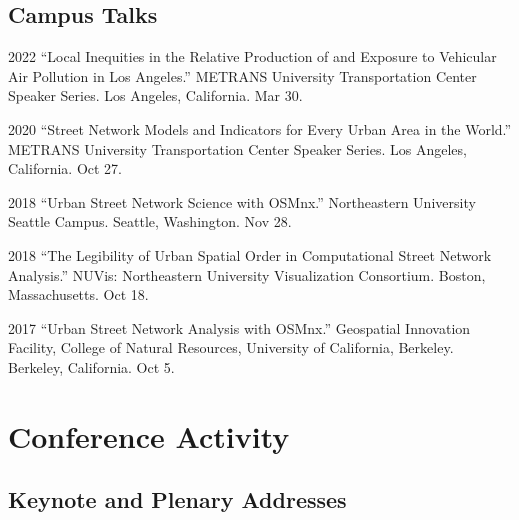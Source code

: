 \documentclass[11pt,letterpaper]{report}
\begin{document}
    \subsection*{Campus Talks}

    \begin{tablist}

        \item[2022] \tab{}\enquote{Local Inequities in the Relative Production of and Exposure to Vehicular Air Pollution in Los Angeles.} METRANS University Transportation Center Speaker Series. Los Angeles, California. Mar 30.

        \item[2020] \tab{}\enquote{Street Network Models and Indicators for Every Urban Area in the World.} METRANS University Transportation Center Speaker Series. Los Angeles, California. Oct 27.

        \item[2018] \tab{}\enquote{Urban Street Network Science with OSMnx.} Northeastern University Seattle Campus. Seattle, Washington. Nov 28.

        \item[2018] \tab{}\enquote{The Legibility of Urban Spatial Order in Computational Street Network Analysis.} NUVis: Northeastern University Visualization Consortium. Boston, Massachusetts. Oct 18.

        \item[2017] \tab{}\enquote{Urban Street Network Analysis with OSMnx.} Geospatial Innovation Facility, College of Natural Resources, University of California, Berkeley. Berkeley, California. Oct 5.

    \end{tablist}



    \section*{Conference Activity}

    \subsection*{Keynote and Plenary Addresses}
\end{document}
